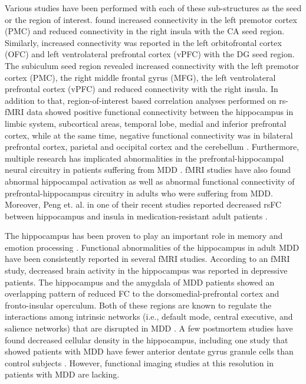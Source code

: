 ﻿\documentclass[12pt]{article}
\begin{document}
Various studies have been performed with each of these sub-structures
as the seed or the region of interest. \textcite{rightinsula} found
increased connectivity in the left premotor cortex (PMC) and reduced
connectivity in the right insula with the CA seed region. Similarly,
increased connectivity was reported in the left orbitofrontal cortex
(OFC) and left ventrolateral prefrontal cortex (vPFC) with the DG seed
region. The subiculum seed region revealed increased connectivity with
the left premotor cortex (PMC), the right middle frontal gyrus (MFG),
the left ventrolateral prefrontal cortex (vPFC) and reduced
connectivity with the right insula. In addition to that,
region-of-interest based correlation analyses performed on rs-fMRI
data showed positive functional connectivity between the hippocampus
in limbic system, subcortical areas, temporal lobe, medial and
inferior prefrontal cortex, while at the same time, negative
functional connectivity was in bilateral prefrontal cortex, parietal
and occipital cortex and the cerebellum
\cite{cerebellum}. Furthermore, multiple research has implicated
abnormalities in the prefrontal-hippocampal neural circuitry in
patients suffering from MDD \cite{prefrontal}. fMRI studies have also
found abnormal hippocampal activation as well as abnormal functional
connectivity of prefrontal-hippocampus circuitry in adults who were
suffering from MDD. Moreover, Peng et. al. in one of their recent
studies reported decreased rsFC between hippocampus and insula in
medication-resistant adult patients \cite{pengetal}.

The hippocampus has been proven to play an important role in memory
\cite{memory} and emotion processing \cite{emotion}. Functional
abnormalities of the hippocampus in adult MDD have been consistently
reported in several fMRI studies. According to an fMRI study,
decreased brain activity in the hippocampus was reported in depressive
patients. The hippocampus and the amygdala of MDD patients showed an
overlapping pattern of reduced FC to the dorsomedial-prefrontal cortex
and fronto-insular operculum. Both of these regions are known to
regulate the interactions among intrinsic networks (i.e., default
mode, central executive, and salience networks) that are disrupted in
MDD \cite{disruptedMDD}. A few postmortem studies have found decreased
cellular density in the hippocampus, including one study that showed
patients with MDD have fewer anterior dentate gyrus granule cells than
control subjects \cite{controlsubject}. However, functional imaging
studies at this resolution in patients with MDD are lacking.
\end{document}
